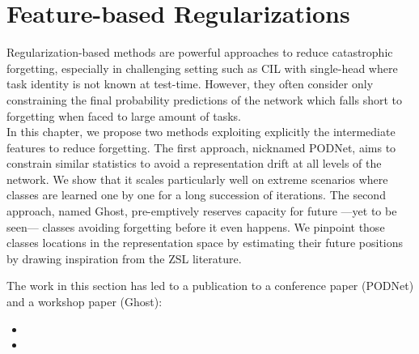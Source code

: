 \chapter{Feature-based Regularizations}
\label{chapter:regularization}

\newcommand{\tableindent}{\,\,\,\,}
\newcommand{\vt}{\mathbf{t}}
\newcommand{\pp}{\,\textit{p.p}}
\newcommand{\std}{$\pm\,$}
\newcommand{\clf}{\textit{clf}}
\newcommand{\gray}[1]{{\color{darkgray}#1}}


\begin{chapabstract}
    Regularization-based methods are powerful approaches to reduce catastrophic
    forgetting, especially in challenging setting such as \ac{CIL} with single-head
    where task identity is not known at test-time. However, they often consider
    only constraining the final probability predictions of the network which falls
    short to forgetting when faced to large amount of tasks. \\
    In this chapter, we propose two methods exploiting explicitly the intermediate
    features to reduce forgetting. The first approach, nicknamed PODNet, aims to
    constrain similar statistics to avoid a representation drift at all levels
    of the network. We show that it scales particularly well on extreme scenarios
    where classes are learned one by one for a long succession of iterations.
    The second approach, named Ghost, pre-emptively reserves
    capacity for future ---yet to be seen--- classes avoiding forgetting before
    it even happens. We pinpoint those classes locations in the representation
    space by estimating their future positions by drawing inspiration from the
    \ac{ZSL} literature.

    The work in this section has led to a publication to a conference paper (PODNet) and a workshop
    paper (Ghost):

    \begin{itemize}
        \item {}
        \item {}
    \end{itemize}

\end{chapabstract}
\newpage

\minitoc
{}

